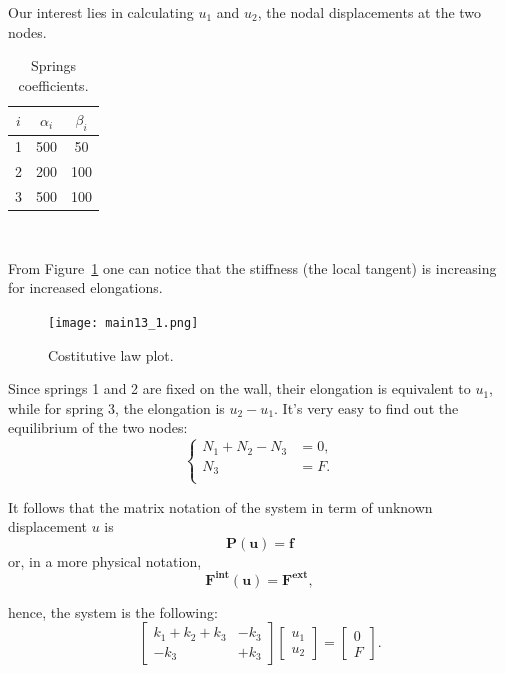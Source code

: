 Our interest lies in calculating $u_1$ and $u_2$, the nodal displacements at the two nodes.

\begin{table}[H]
    \centering 
    \begin{tabular}{ccc}
    \hline
    \rowcolor{bluepoli!40} %
    $i$ & $\alpha_i$ & $\beta_i$  \\
    \hline
    1 & 500 & 50 \\
    2 & 200 & 100 \\
    3 & 500 & 100 \\
    \hline
    \end{tabular}
    \\[10pt]
    \caption{Springs coefficients.}
    \label{table:alpha_beta}
\end{table}

From Figure~\ref{fig:main13_1} one can notice that the stiffness (the local tangent) is increasing for increased elongations.

\begin{figure}[H]
    \centering
    \texttt{[image: main13\_1.png]}
    \caption{Costitutive law plot.}
    \label{fig:main13_1}
\end{figure}

Since springs 1 and 2 are fixed on the wall, their elongation is equivalent to $u_1$, while for spring 3, the elongation is $u_2-u_1$. It's very easy to find out the equilibrium of the two nodes:
\begin{equation}
\label{eq:spring_2}
\left\{
\begin{aligned}
N_1+N_2-N_3&=0, \\
N_3&=F.\\
\end{aligned}
\right.
\end{equation}

It follows that the matrix notation of the system in term of unknown displacement $u$ is
\begin{equation}
\label{eq:spring_25}
\mathbf{P}(\mathbf{u})=\mathbf{f}
\end{equation}
or, in a more physical notation,
\begin{equation}
\label{eq:spring_275}
\mathbf{F}^{\textbf{int}}(\mathbf{u})=\mathbf{F}^{\textbf{ext}},
\end{equation}

hence, the system is the following:
\begin{equation}
\label{eq:spring_3}
\left[
\begin{array}{cc}
 k_1+k_2+k_3 &-k_3 \\
 -k_3 & +k_3
\end{array}
\right]
\left[
\begin{array}{c}
 u_1 \\
 u_2
\end{array}
\right]
=
\left[
\begin{array}{c}
 0 \\
 F
\end{array}
\right].
\end{equation}

